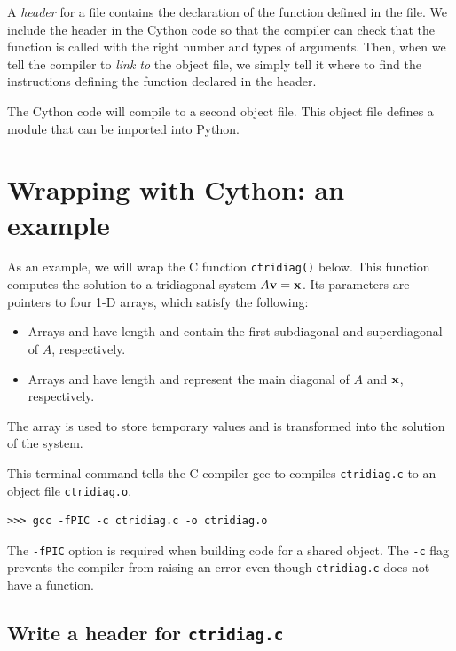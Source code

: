 A \emph{header} for a file contains the declaration of the function defined in the file.
We include the header in the Cython code so that the compiler can check that the function is called with the right number and types of arguments.
Then, when we tell the compiler to \emph{link to} the object file, we simply tell it where to find the instructions defining the function declared in the header.

The Cython code will compile to a second object file.
This object file defines a module that can be imported into Python.

\section*{Wrapping with Cython: an example}
As an example, we will wrap the C function \texttt{ctridiag()} below.
This function computes the solution to a tridiagonal system $A{\bf v} = {\bf x}$.
Its parameters are pointers to four 1-D arrays, which satisfy the following:
\begin{itemize}
\item Arrays  and  have length  and contain the first subdiagonal and superdiagonal of $A$, respectively.
\item Arrays  and  have length  and represent the main diagonal of $A$ and ${\bf x}$, respectively.
\end{itemize}
The array  is used to store temporary values and  is transformed into the solution of the system.



This terminal command tells the C-compiler gcc to compiles \texttt{ctridiag.c} to an object file \texttt{ctridiag.o}.

\begin{lstlisting}
>>> gcc -fPIC -c ctridiag.c -o ctridiag.o
\end{lstlisting}
The \texttt{-fPIC} option is required when building code for a shared object.
The \texttt{-c} flag prevents the compiler from raising an error even though \texttt{ctridiag.c} does not have a  function.




\subsection*{Write a header for \texttt{ctridiag.c}}

